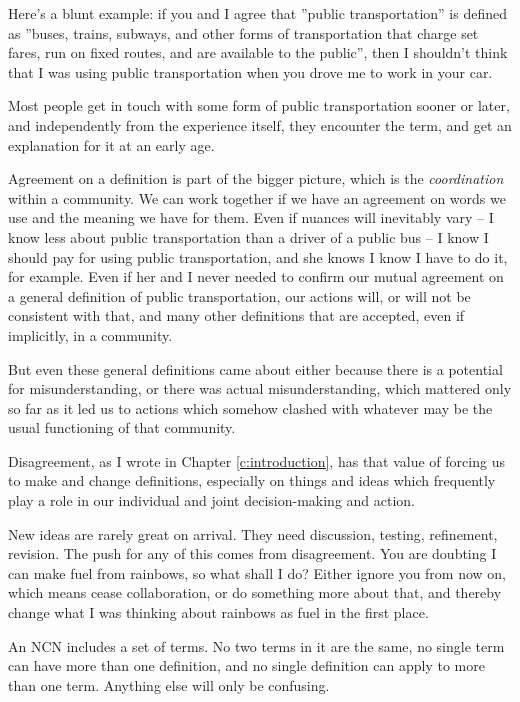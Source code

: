 \documentclass[graybox,envcountchap,sectrefs]{svmono}
\newcommand{\ncn}{NCN}
\begin{document}
Here's a blunt example: if you and I agree that ''public transportation'' is defined as ''buses, trains, subways, and other forms of transportation that charge set fares, run on fixed routes, and are available to the public'', then I shouldn't think that I was using public transportation when you drove me to work in your car.

Most people get in touch with some form of public transportation sooner or later, and independently from the experience itself, they encounter the term, and get an explanation for it at an early age. 

Agreement on a definition is part of the bigger picture, which is the \textit{coordination} within a community. We can work together if we have an agreement on words we use and the meaning we have for them. Even if nuances will inevitably vary -- I know less about public transportation than a driver of a public bus -- I know I should pay for using public transportation, and she knows I know I have to do it, for example. Even if her and I never needed to confirm our mutual agreement on a general definition of public transportation, our actions will, or will not be consistent with that, and many other definitions that are accepted, even if implicitly, in a community.

But even these general definitions came about either because there is a potential for misunderstanding, or there was actual misunderstanding, which mattered only so far as it led us to actions which somehow clashed with whatever may be the usual functioning of that community. 

Disagreement, as I wrote in Chapter \ref{c:introduction}, has that value of forcing us to make and change definitions, especially on things and ideas which frequently play a role in our individual and joint decision-making and action. 

New ideas are rarely great on arrival. They need discussion, testing, refinement, revision. The push for any of this comes from disagreement. You are doubting I can make fuel from rainbows, so what shall I do? Either ignore you from now on, which means cease collaboration, or do something more about that, and thereby change what I was thinking about rainbows as fuel in the first place.

An \ncn{} includes a set of terms. No two terms in it are the same, no single term can have more than one definition, and no single definition can apply to more than one term. Anything else will only be confusing.
\end{document}
